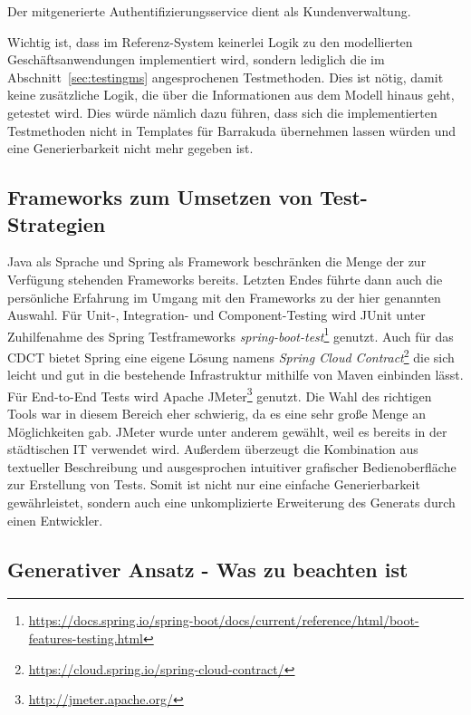 \documentclass[12pt,a4paper,bibliography=totocnumbered,listof=totocnumbered]{scrartcl}
\begin{document}
Der mitgenerierte Authentifizierungsservice dient als Kundenverwaltung.


Wichtig ist, dass im Referenz-System keinerlei Logik zu den modellierten Geschäftsanwendungen implementiert wird, sondern lediglich die im Abschnitt~\ref{sec:testingms} angesprochenen Testmethoden. Dies ist nötig, damit keine zusätzliche Logik, die über die Informationen aus dem Modell hinaus geht, getestet wird. Dies würde nämlich dazu führen, dass sich die implementierten Testmethoden nicht in Templates für Barrakuda übernehmen lassen würden und eine Generierbarkeit nicht mehr gegeben ist.

\subsection{Frameworks zum Umsetzen von Test-Strategien}\label{ch:ms-test-frw}

Java als Sprache und Spring als Framework beschränken die Menge der zur Verfügung stehenden Frameworks bereits. Letzten Endes führte dann auch die persönliche Erfahrung im Umgang mit den Frameworks zu der hier genannten Auswahl. Für Unit-, Integration- und Component-Testing wird JUnit unter Zuhilfenahme des Spring Testframeworks \textit{spring-boot-test}\footnote{\url{https://docs.spring.io/spring-boot/docs/current/reference/html/boot-features-testing.html}} genutzt.
Auch für das \ac{CDCT} bietet Spring eine eigene Lösung namens \textit{Spring Cloud Contract}\footnote{\url{https://cloud.spring.io/spring-cloud-contract/}} die sich leicht und gut in die bestehende Infrastruktur mithilfe von Maven einbinden lässt.
Für End-to-End Tests wird Apache JMeter\footnote{\url{http://jmeter.apache.org/}} genutzt. Die Wahl des richtigen Tools war in diesem Bereich eher schwierig, da es eine sehr große Menge an Möglichkeiten gab. JMeter wurde unter anderem gewählt, weil es bereits in der städtischen IT verwendet wird. Außerdem überzeugt die Kombination aus textueller Beschreibung und ausgesprochen intuitiver grafischer Bedienoberfläche zur Erstellung von Tests. Somit ist nicht nur eine einfache Generierbarkeit gewährleistet, sondern auch eine unkomplizierte Erweiterung des Generats durch einen Entwickler.

\subsection{Generativer Ansatz - Was zu beachten ist}
\end{document}
